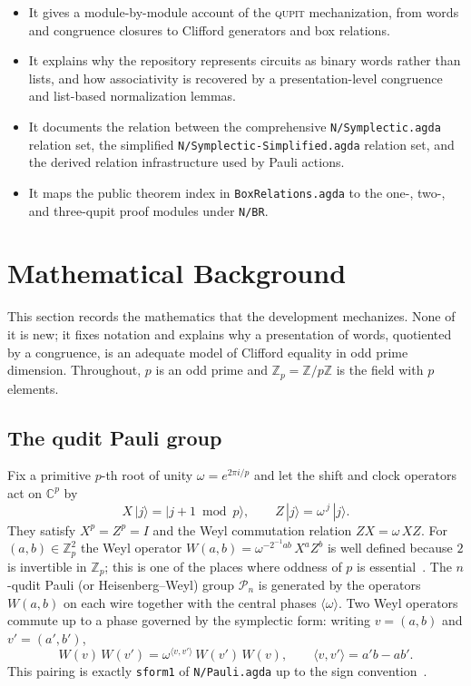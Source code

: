 \documentclass[sigplan,screen,review,anonymous]{acmart}
\newcommand{\Qupit}{\textsc{qupit}\xspace}
\newcommand{\Zp}{\mathbb{Z}_p}
\newcommand{\file}[1]{\texttt{#1}}
\newcommand{\PauliGrp}{\mathcal{P}}
\begin{document}
\begin{itemize}
\item It gives a module-by-module account of the \Qupit
  mechanization, from words and congruence closures to Clifford
  generators and box relations.
\item It explains why the repository represents circuits as binary
  words rather than lists, and how associativity is recovered by a
  presentation-level congruence and list-based normalization lemmas.
\item It documents the relation between the comprehensive
  \file{N/Symplectic.agda} relation set, the simplified
  \file{N/Symplectic-Simplified.agda} relation set, and the derived
  relation infrastructure used by Pauli actions.
\item It maps the public theorem index in \file{BoxRelations.agda} to
  the one-, two-, and three-qupit proof modules under \file{N/BR}.
\end{itemize}

\section{Mathematical Background}
\label{sec:math}

This section records the mathematics that the development mechanizes.
None of it is new; it fixes notation and explains why a presentation of
words, quotiented by a congruence, is an adequate model of Clifford
equality in odd prime dimension.  Throughout, \(p\) is an odd prime and
\(\Zp = \mathbb{Z}/p\mathbb{Z}\) is the field with \(p\) elements.

\subsection{The qudit Pauli group}

Fix a primitive \(p\)-th root of unity \(\omega = e^{2\pi i/p}\) and let
the shift and clock operators act on \(\mathbb{C}^p\) by
\[
  X\,|j\rangle = |j+1 \bmod p\rangle,
  \qquad
  Z\,|j\rangle = \omega^{\,j}\,|j\rangle .
\]
They satisfy \(X^p = Z^p = I\) and the Weyl commutation relation
\(ZX = \omega\,XZ\).  For \((a,b)\in\Zp^2\) the Weyl operator
\(W(a,b) = \omega^{-2^{-1}ab}\,X^a Z^b\) is well defined because \(2\) is
invertible in \(\Zp\); this is one of the places where oddness of \(p\)
is essential~\cite{Appleby2005,Gross2006}.  The \(n\)-qudit Pauli (or
Heisenberg--Weyl) group \(\PauliGrp_n\) is generated by the operators
\(W(a,b)\) on each wire together with the central phases
\(\langle\omega\rangle\).  Two Weyl operators commute up to a phase
governed by the symplectic form: writing \(v=(a,b)\) and
\(v'=(a',b')\),
\[
  W(v)\,W(v') = \omega^{\langle v,v'\rangle}\, W(v')\,W(v),
  \qquad
  \langle v,v'\rangle = a'b - a b' .
\]
This pairing is exactly \texttt{sform1} of \file{N/Pauli.agda} up to the
sign convention~\cite{Gottesman1999,Hostens2005}.
\end{document}
